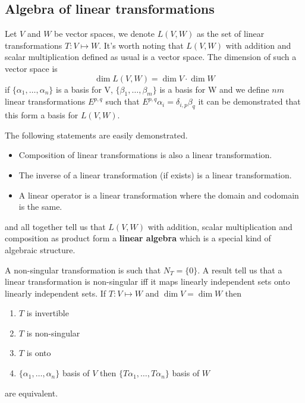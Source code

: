 \documentclass[../../../main.tex]{subfiles}
\begin{document}
\subsection{Algebra of linear transformations}
Let $V$ and $W$ be vector spaces, we denote $L(V,W)$ as the set of linear transformations $T:V\mapsto W$. It's worth noting that $L(V,W)$ with addition and scalar multiplication defined as usual is a vector space. The dimension of such a vector space is
\begin{equation*}
    \dim L(V,W) = \dim V \cdot \dim W
\end{equation*}
if $\{\alpha_1,\dots,\alpha_n\}$ is a basis for V, $\{\beta_1,\dots,\beta_m\}$ is a basis for W and we define $nm$ linear transformations $E^{p,q}$ such that $E^{p,q}\alpha_i = \delta_{i,p}\beta_q$ it can be demonstrated that this form a basis for $L(V,W)$.

The following statements are easily demonstrated.
\begin{itemize}
    \item Composition of linear transformations is also a linear transformation.
    \item The inverse of a linear transformation (if exists) is a linear transformation.
    \item A linear operator is a linear transformation where the domain and codomain is the same. 
\end{itemize}
and all together tell us that $L(V,W)$ with addition, scalar multiplication and composition as product form a \textbf{linear algebra} which is a special kind of algebraic structure.

A non-singular transformation is such that $N_T=\{0\}$. A result tell us that a linear transformation is non-singular iff it maps linearly independent sets onto linearly independent sets. If $T:V\mapsto W$ and $\dim V = \dim W$ then
\begin{enumerate}
    \item $T$ is invertible
    \item $T$ is non-singular
    \item $T$ is onto 
    \item $\{\alpha_1,\dots,\alpha_n\}$ basis of $V$ then $\{T\alpha_1,\dots,T\alpha_n\}$ basis of $W$
\end{enumerate}
are equivalent.
\end{document}

